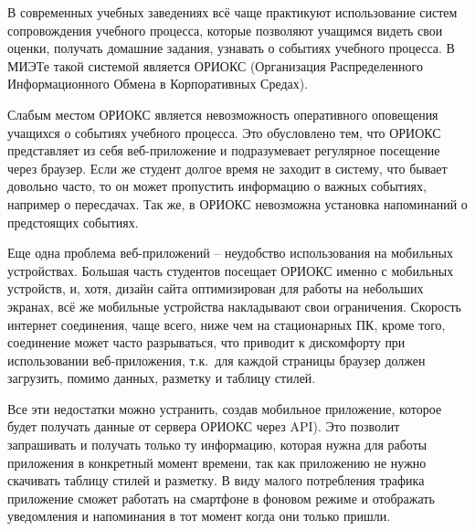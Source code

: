\Introduction
{}
В современных учебных заведениях всё чаще практикуют использование систем сопровождения учебного процесса, которые позволяют учащимся видеть свои оценки, получать домашние задания, узнавать о событиях учебного процесса.
В МИЭТе такой системой является ОРИОКС (Организация Распределенного Информационного Обмена в Корпоративных Средах).

Слабым местом ОРИОКС является невозможность оперативного оповещения учащихся о событиях учебного процесса.
Это обусловлено тем, что ОРИОКС представляет из себя веб-приложение и подразумевает регулярное посещение через браузер.
Если же студент долгое время не заходит в систему, что бывает довольно часто, то он может пропустить информацию о важных событиях, например о пересдачах.
Так же, в ОРИОКС невозможна установка напоминаний о предстоящих событиях.

Еще одна проблема веб-приложений – неудобство использования на мобильных
устройствах.
Большая часть студентов посещает ОРИОКС именно с мобильных
устройств, и, хотя, дизайн сайта оптимизирован для работы на небольших экранах, всё же мобильные устройства накладывают свои ограничения.
Скорость интернет соединения, чаще всего, ниже чем на стационарных ПК, кроме того, соединение может часто разрываться, что приводит к дискомфорту
при использовании веб-приложения, т.к.\ для каждой страницы браузер должен
загрузить, помимо данных, разметку и таблицу стилей.


Все эти недостатки можно устранить, создав мобильное приложение, которое будет получать данные от сервера ОРИОКС через API).
Это позволит запрашивать и получать только ту информацию, которая нужна для работы приложения в конкретный момент времени, так как приложению не нужно скачивать таблицу стилей и разметку.
В виду малого потребления трафика приложение сможет работать на смартфоне в фоновом режиме и отображать уведомления и напоминания в тот момент когда они только пришли.

